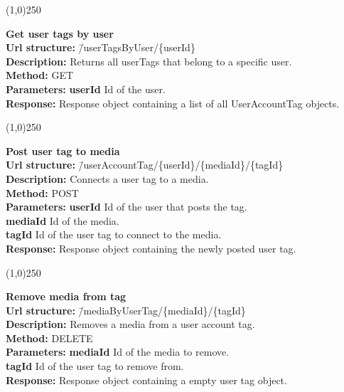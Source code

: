 \documentclass[11pt]{article}
\begin{document}
\begin{center}\line(1,0){250}\end{center}

\begin{tabbing}
\textbf{Get user tags by user} \\
\textcolor{black!60}{\textbf{Url structure:}} \hspace{0.2in} \= /userTagsByUser/\{userId\} \\
\textcolor{black!60}{\textbf{Description:}}  \> Returns all userTags that belong to a specific user. \\
\textcolor{black!60}{\textbf{Method:}} \> GET \\
\textcolor{black!60}{\textbf{Parameters:}} \> \textbf{userId} Id of the user. \\
\textcolor{black!60}{\textbf{Response:}} \> Response object containing a list of all UserAccountTag objects.
\end{tabbing}

\begin{center}\line(1,0){250}\end{center}

\begin{tabbing}
\textbf{Post user tag to media} \\
\textcolor{black!60}{\textbf{Url structure:}} \hspace{0.2in} \= /userAccountTag/\{userId\}/\{mediaId\}/\{tagId\} \\
\textcolor{black!60}{\textbf{Description:}}  \> Connects a user tag to a media. \\
\textcolor{black!60}{\textbf{Method:}} \> POST \\
\textcolor{black!60}{\textbf{Parameters:}} \> \textbf{userId} Id of the user that posts the tag. \\
\> \textbf{mediaId} Id of the media. \\
\> \textbf{tagId} Id of the user tag to connect to the media. \\
\textcolor{black!60}{\textbf{Response:}} \> Response object containing the newly posted user tag.
\end{tabbing}

\begin{center}\line(1,0){250}\end{center}

\begin{tabbing}
\textbf{Remove media from tag} \\
\textcolor{black!60}{\textbf{Url structure:}} \hspace{0.2in} \= /mediaByUserTag/\{mediaId\}/\{tagId\} \\
\textcolor{black!60}{\textbf{Description:}}  \> Removes a media from a user account tag.\\
\textcolor{black!60}{\textbf{Method:}} \> DELETE \\
\textcolor{black!60}{\textbf{Parameters:}} \> \textbf{mediaId} Id of the media to remove. \\
\> \textbf{tagId} Id of the user tag to remove from. \\
\textcolor{black!60}{\textbf{Response:}} \> Response object containing a empty user tag object.
\end{tabbing}
\end{document}
